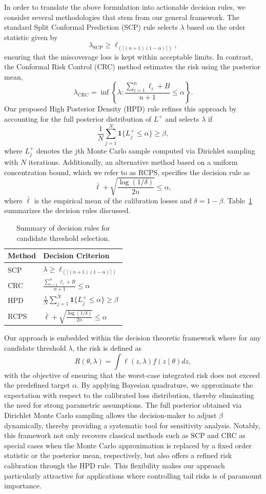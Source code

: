\documentclass{article} %
\begin{document}
In order to translate the above formulation into actionable decision rules, we consider several methodologies that stem from our general framework. The standard Split Conformal Prediction (SCP) rule selects \(\lambda\) based on the order statistic given by 
\[
\lambda_{\text{SCP}} \ge \ell_{(\lceil (n+1)(1-\alpha) \rceil)},
\]
ensuring that the miscoverage loss is kept within acceptable limits. In contrast, the Conformal Risk Control (CRC) method estimates the risk using the posterior mean,
\[
\lambda_{\text{CRC}} = \inf\left\{\lambda : \frac{\sum_{i=1}^n \ell_i + B}{n+1} \le \alpha\right\}.
\]
Our proposed High Posterior Density (HPD) rule refines this approach by accounting for the full posterior distribution of \(L^+\) and selects \(\lambda\) if
\[
\frac{1}{N}\sum_{j=1}^N \mathbf{1}\{L^+_j \le \alpha\} \ge \beta,
\]
where \(L^+_j\) denotes the \(j\)th Monte Carlo sample computed via Dirichlet sampling with \(N\) iterations. Additionally, an alternative method based on a uniform concentration bound, which we refer to as RCPS, specifies the decision rule as
\[
\bar{\ell} + \sqrt{\frac{\log(1/\delta)}{2n}} \le \alpha,
\]
where \(\bar{\ell}\) is the empirical mean of the calibration losses and \(\delta = 1-\beta\). Table~\ref{tab:methods} summarizes the decision rules discussed.

\begin{table}[ht]
\centering
\begin{tabular}{|l|l|}
\hline
Method & Decision Criterion \\ \hline
SCP  & \(\lambda \ge \ell_{(\lceil (n+1)(1-\alpha) \rceil)}\) \\ \hline
CRC  & \(\frac{\sum_{i=1}^n \ell_i + B}{n+1} \le \alpha\) \\ \hline
HPD  & \(\frac{1}{N}\sum_{j=1}^N \mathbf{1}\{L^+_j \le \alpha\} \ge \beta\) \\ \hline
RCPS & \(\bar{\ell} + \sqrt{\frac{\log(1/\delta)}{2n}} \le \alpha\) \\ \hline
\end{tabular}
\caption{Summary of decision rules for candidate threshold selection.}
\label{tab:methods}
\end{table}

Our approach is embedded within the decision theoretic framework where for any candidate threshold \(\lambda\), the risk is defined as 
\[
R(\theta, \lambda) = \int \ell(z,\lambda)f(z \mid \theta)dz,
\]
with the objective of ensuring that the worst-case integrated risk does not exceed the predefined target \(\alpha\). By applying Bayesian quadrature, we approximate the expectation with respect to the calibrated loss distribution, thereby eliminating the need for strong parametric assumptions. The full posterior obtained via Dirichlet Monte Carlo sampling allows the decision-maker to adjust \(\beta\) dynamically, thereby providing a systematic tool for sensitivity analysis. Notably, this framework not only recovers classical methods such as SCP and CRC as special cases when the Monte Carlo approximation is replaced by a fixed order statistic or the posterior mean, respectively, but also offers a refined risk calibration through the HPD rule. This flexibility makes our approach particularly attractive for applications where controlling tail risks is of paramount importance.
\end{document}
